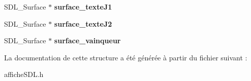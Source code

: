 \begin{DoxyCompactItemize}
\item 
\hypertarget{struct_jeu_s_d_l_ae098fa0806e909503f540634485ae838}{S\-D\-L\-\_\-\-Surface $\ast$ {\bfseries surface\-\_\-texte\-J1}}\label{struct_jeu_s_d_l_ae098fa0806e909503f540634485ae838}

\item 
\hypertarget{struct_jeu_s_d_l_ae17e5d5097d9a63154a63d0e4dfba6f2}{S\-D\-L\-\_\-\-Surface $\ast$ {\bfseries surface\-\_\-texte\-J2}}\label{struct_jeu_s_d_l_ae17e5d5097d9a63154a63d0e4dfba6f2}

\item 
\hypertarget{struct_jeu_s_d_l_a36f58a6a110925a0c0a0dbaeff517fa8}{S\-D\-L\-\_\-\-Surface $\ast$ {\bfseries surface\-\_\-vainqueur}}\label{struct_jeu_s_d_l_a36f58a6a110925a0c0a0dbaeff517fa8}

\end{DoxyCompactItemize}


La documentation de cette structure a été générée à partir du fichier suivant \-:\begin{DoxyCompactItemize}
\item 
affiche\-S\-D\-L.\-h\end{DoxyCompactItemize}
